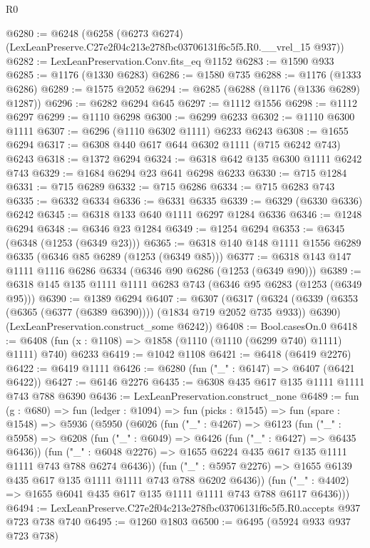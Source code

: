 \begin{lexlean}{R0}
\begin{coremodule}
@6280 := @6248
    (@6258 (@6273 @6274) (LexLeanPreserve.C27e2f04c213e278fbc03706131f6c5f5.R0.__vrel_15 @937))
@6282 := LexLeanPreservation.Conv.fits_eq @1152
@6283 := @1590 @933
@6285 := @1176 (@1330 @6283)
@6286 := @1580 @735
@6288 := @1176 (@1333 @6286)
@6289 := @1575 @2052
@6294 := @6285 (@6288 (@1176 (@1336 @6289) @1287))
@6296 := @6282 @6294 @645
@6297 := @1112 @1556
@6298 := @1112 @6297
@6299 := @1110 @6298
@6300 := @6299 @6233
@6302 := @1110 @6300 @1111
@6307 := @6296 (@1110 @6302 @1111) @6233 @6243
@6308 := @1655 @6294
@6317 := @6308 @440 @617 @644 @6302 @1111 (@715 @6242 @743) @6243
@6318 := @1372 @6294
@6324 := @6318 @642 @135 @6300 @1111 @6242 @743
@6329 := @1684 @6294 @23 @641 @6298 @6233
@6330 := @715 @1284
@6331 := @715 @6289
@6332 := @715 @6286
@6334 := @715 @6283 @743
@6335 := @6332 @6334
@6336 := @6331 @6335
@6339 := @6329 (@6330 @6336) @6242
@6345 := @6318 @133 @640 @1111 @6297 @1284 @6336
@6346 := @1248 @6294
@6348 := @6346 @23 @1284
@6349 := @1254 @6294
@6353 := @6345 (@6348 (@1253 (@6349 @23)))
@6365 := @6318 @140 @148 @1111 @1556 @6289 @6335 (@6346 @85 @6289 (@1253 (@6349 @85)))
@6377 := @6318 @143 @147 @1111 @1116 @6286 @6334 (@6346 @90 @6286 (@1253 (@6349 @90)))
@6389 := @6318 @145 @135 @1111 @1111 @6283 @743 (@6346 @95 @6283 (@1253 (@6349 @95)))
@6390 := @1389 @6294
@6407 := @6307
    (@6317
      (@6324 (@6339 (@6353 (@6365 (@6377 (@6389 @6390)))) (@1834 @719 @2052 @735 @933)) @6390)
      (LexLeanPreservation.construct_some @6242))
@6408 := Bool.casesOn.{0}
@6418 := @6408 (fun (x : @1108) => @1858 (@1110 (@1110 (@6299 @740) @1111) @1111) @740) @6233
@6419 := @1042 @1108
@6421 := @6418 (@6419 @2276)
@6422 := @6419 @1111
@6426 := @6280 (fun ("_" : @6147) => @6407 (@6421 @6422))
@6427 := @6146 @2276
@6435 := @6308 @435 @617 @135 @1111 @1111 @743 @788 @6390
@6436 := LexLeanPreservation.construct_none
@6489 := fun (g : @680) =>
  fun (ledger : @1094) =>
  fun (picks : @1545) =>
  fun (spare : @1548) =>
  @5936
    (@5950
      (@6026
        (fun ("_" : @4267) =>
        @6123
          (fun ("_" : @5958) =>
          @6208
            (fun ("_" : @6049) => @6426 (fun ("_" : @6427) => @6435 @6436))
            (fun ("_" : @6048 @2276) =>
            @1655 @6224 @435 @617 @135 @1111 @1111 @743 @788 @6274 @6436))
          (fun ("_" : @5957 @2276) => @1655 @6139 @435 @617 @135 @1111 @1111 @743 @788 @6202 @6436))
        (fun ("_" : @4402) => @1655 @6041 @435 @617 @135 @1111 @1111 @743 @788 @6117 @6436)))
@6494 := LexLeanPreserve.C27e2f04c213e278fbc03706131f6c5f5.R0.accepts @937 @723 @738 @740
@6495 := @1260 @1803
@6500 := @6495 (@5924 @933 @937 @723 @738)

\end{coremodule}
\end{lexlean}
